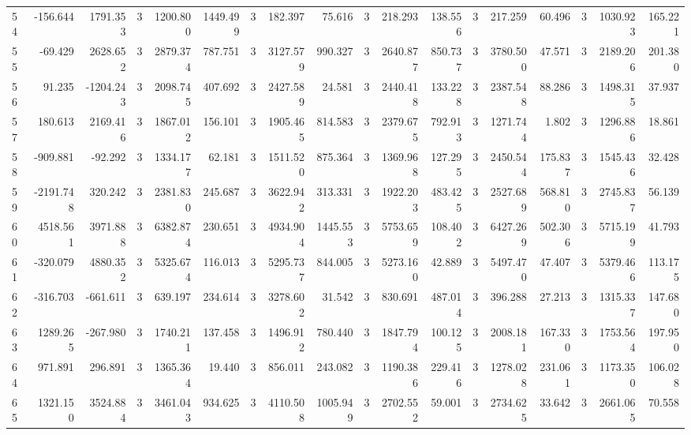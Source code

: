 \begin{table}[ht]
\begin{tabular}{lrrrrrrrrrrrrrrrrr}
54 & -156.644 & 1791.353 & 3 & 1200.800 & 1449.499 & 3 & 182.397 & 75.616 & 3 & 218.293 & 138.556 & 3 & 217.259 & 60.496 & 3 & 1030.923 & 165.221 \\
55 & -69.429 & 2628.652 & 3 & 2879.374 & 787.751 & 3 & 3127.579 & 990.327 & 3 & 2640.877 & 850.737 & 3 & 3780.500 & 47.571 & 3 & 2189.206 & 201.380 \\
56 & 91.235 & -1204.243 & 3 & 2098.745 & 407.692 & 3 & 2427.589 & 24.581 & 3 & 2440.418 & 133.228 & 3 & 2387.548 & 88.286 & 3 & 1498.315 & 37.937 \\
57 & 180.613 & 2169.416 & 3 & 1867.012 & 156.101 & 3 & 1905.465 & 814.583 & 3 & 2379.675 & 792.913 & 3 & 1271.744 & 1.802 & 3 & 1296.886 & 18.861 \\
58 & -909.881 & -92.292 & 3 & 1334.177 & 62.181 & 3 & 1511.520 & 875.364 & 3 & 1369.968 & 127.295 & 3 & 2450.544 & 175.837 & 3 & 1545.436 & 32.428 \\
59 & -2191.748 & 320.242 & 3 & 2381.830 & 245.687 & 3 & 3622.942 & 313.331 & 3 & 1922.203 & 483.425 & 3 & 2527.689 & 568.810 & 3 & 2745.837 & 56.139 \\
60 & 4518.561 & 3971.888 & 3 & 6382.874 & 230.651 & 3 & 4934.904 & 1445.553 & 3 & 5753.659 & 108.402 & 3 & 6427.269 & 502.306 & 3 & 5715.199 & 41.793 \\
61 & -320.079 & 4880.352 & 3 & 5325.674 & 116.013 & 3 & 5295.737 & 844.005 & 3 & 5273.160 & 42.889 & 3 & 5497.470 & 47.407 & 3 & 5379.466 & 113.175 \\
62 & -316.703 & -661.611 & 3 & 639.197 & 234.614 & 3 & 3278.602 & 31.542 & 3 & 830.691 & 487.014 & 3 & 396.288 & 27.213 & 3 & 1315.337 & 147.680 \\
63 & 1289.265 & -267.980 & 3 & 1740.211 & 137.458 & 3 & 1496.912 & 780.440 & 3 & 1847.794 & 100.125 & 3 & 2008.181 & 167.330 & 3 & 1753.564 & 197.950 \\
64 & 971.891 & 296.891 & 3 & 1365.364 & 19.440 & 3 & 856.011 & 243.082 & 3 & 1190.386 & 229.416 & 3 & 1278.028 & 231.061 & 3 & 1173.350 & 106.028 \\
65 & 1321.150 & 3524.884 & 3 & 3461.043 & 934.625 & 3 & 4110.508 & 1005.949 & 3 & 2702.552 & 59.001 & 3 & 2734.625 & 33.642 & 3 & 2661.065 & 70.558 \\
\hline
\end{tabular}
\end{table}
